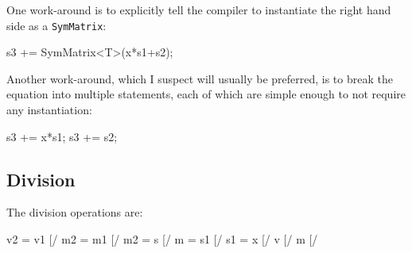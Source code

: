 \documentclass[twoside,letterpaper,11pt]{article}
\renewcommand{\tt}[1]{{\lstinline {#1}}}
\begin{document}
One work-around is to explicitly tell the compiler to instantiate the right hand
side as a \tt{SymMatrix}:
\begin{tmvcode}
s3 += SymMatrix<T>(x*s1+s2);
\end{tmvcode}

Another work-around, which I suspect will usually be preferred, is to break the 
equation into multiple statements, each of which are simple enough to not require
any instantiation:
\begin{tmvcode}
s3 += x*s1;
s3 += s2;
\end{tmvcode}

\subsection{Division}
\label{SymMatrix_Division}

The division operations are:
\begin{tmvcode}
v2 = v1 [/%
m2 = m1 [/%
m2 = s [/%
m = s1 [/%
s1 = x [/%
v [/%
m [/%
\end{tmvcode}
\end{document}
